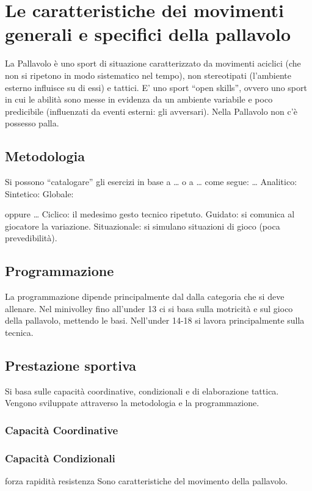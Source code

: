 \chapter{Le caratteristiche dei movimenti generali e specifici della pallavolo}

La Pallavolo è uno sport di situazione caratterizzato da movimenti aciclici (che non si ripetono in modo sistematico nel tempo), non stereotipati (l’ambiente esterno influisce su di essi) e tattici. E’ uno sport “open skills”, ovvero uno sport in cui le abilità sono messe in evidenza da un ambiente variabile e poco predicibile (influenzati da eventi esterni: gli avversari). Nella Pallavolo non c’è possesso palla.

\section{Metodologia}
Si possono “catalogare” gli esercizi in base  a … o a … come segue:
…
Analitico:
Sintetico:
Globale:

oppure … 
Ciclico: il medesimo gesto tecnico ripetuto.
Guidato: si comunica al giocatore la variazione.
Situazionale: si simulano situazioni di gioco (poca prevedibilità).

\section{Programmazione}
La programmazione dipende principalmente dal dalla categoria che si deve allenare. Nel minivolley fino all’under 13 ci si basa sulla motricità e sul gioco della pallavolo, mettendo le basi. Nell’under 14-18 si lavora principalmente sulla tecnica.

\section{Prestazione sportiva}
Si basa sulle capacità coordinative, condizionali e di elaborazione tattica. Vengono sviluppate attraverso la metodologia e la programmazione.

\subsection{Capacità Coordinative}

\subsection{Capacità Condizionali}
forza
rapidità
resistenza
Sono caratteristiche del movimento della pallavolo.

